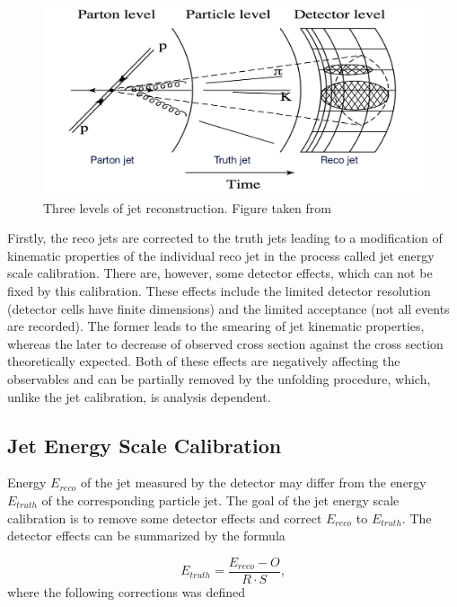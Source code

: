 \begin{figure}[t]
  \centering
  \includegraphics[width=\textwidth]{Chapter2/JetPhases.png}
  \caption[Three levels of jet reconstruction.]
    {Three levels of jet reconstruction. Figure taken from \cite{ZdenekThesis} } 
  \label{fig:JetPhases}
\end{figure}

Firstly, the reco jets are corrected to the truth jets leading to a modification
of kinematic properties of the individual reco jet in the process called jet energy
scale calibration.
There are, however, some detector effects, which can not be
fixed by this calibration. These effects include the limited detector resolution
(detector cells have finite dimensions) and the limited acceptance (not all
events are recorded). The former leads to the smearing of jet kinematic
properties, whereas the later to decrease of observed cross section against the
cross section theoretically expected. Both of these effects are negatively affecting the
observables and can be partially removed by the unfolding procedure, which,
unlike the jet calibration, is analysis dependent.

\subsection{Jet Energy Scale Calibration}

Energy $E_{reco}$ of the jet measured by the detector may differ from the energy
$E_{truth}$ of the corresponding particle jet. The goal of the jet energy scale
calibration is to remove some detector effects and correct $E_{reco}$ to
$E_{truth}$. The detector effects can be summarized by the formula

\begin{equation}
  E_{truth} = \frac{E_{reco} - O}{R \cdot S},
\end{equation}
where the following corrections was defined

